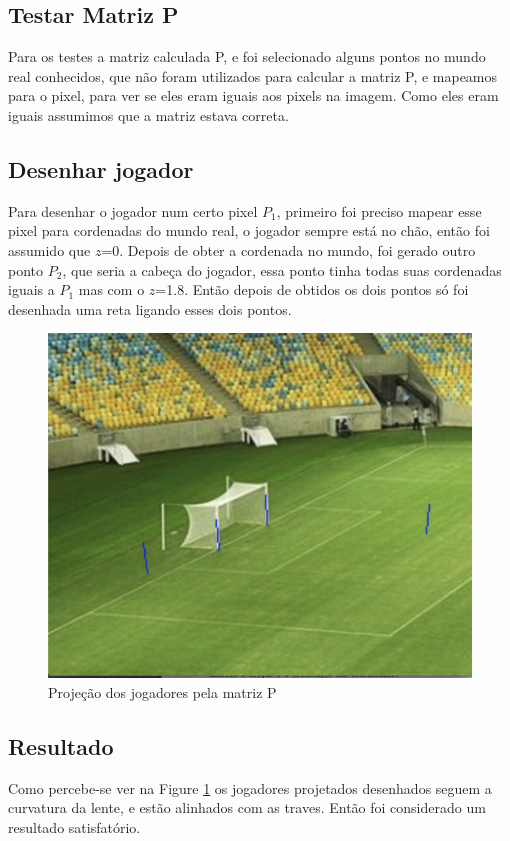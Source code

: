 \documentclass{article}
\begin{document}
    \subsection{Testar Matriz P}
    Para os testes a matriz calculada P, e foi selecionado alguns pontos  no mundo real conhecidos, que não foram utilizados para calcular a matriz P, e mapeamos para o pixel, para ver se eles eram iguais aos pixels na imagem. Como eles eram iguais assumimos que a matriz estava correta.
    \subsection{Desenhar jogador}
    Para desenhar o jogador num certo pixel \(P_1\), primeiro foi preciso mapear esse pixel para cordenadas do mundo real, o jogador sempre está no chão, então foi assumido que \(z\)=0. Depois de obter a cordenada no mundo, foi gerado outro ponto \(P_2\), que seria a cabeça do jogador, essa ponto tinha todas suas cordenadas iguais a \(P_1\) mas com o \(z\)=1.8. Então depois de obtidos os dois pontos só foi desenhada uma reta ligando esses dois pontos.
    \begin{figure}[h!]
    \includegraphics[scale=0.4]{jogadore1.png}
    \caption{Projeção dos jogadores pela matriz P}
    \label{fig:resultado1}
    \end{figure}
    \subsection{Resultado}
    Como percebe-se ver na Figure \ref{fig:resultado1} os jogadores projetados desenhados seguem a curvatura da lente, e estão alinhados com as traves. Então foi considerado um resultado satisfatório.
\end{document}
